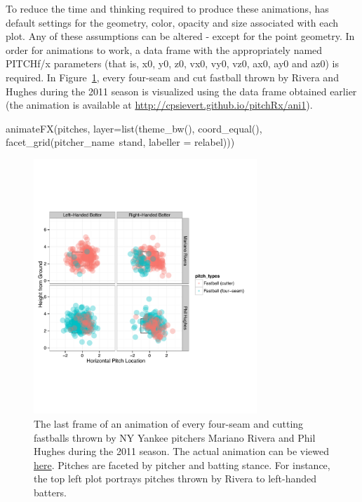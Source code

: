 \begin{article}
To reduce the time and thinking required to produce these animations,
 has default settings for the geometry, color, opacity
and size associated with each plot. Any of these assumptions can be
altered - except for the point geometry. In order for animations to
work, a data frame with the appropriately named PITCHf/x parameters
(that is, x0, y0, z0, vx0, vy0, vz0, ax0, ay0 and az0) is required.
In Figure~\ref{fig:animate1}, every four-seam and cut fastball thrown
by Rivera and Hughes during the 2011 season is visualized using the
 data frame obtained earlier (the animation is available
at \url{http://cpsievert.github.io/pitchRx/ani1}).
%
\begin{Schunk}
\begin{Sinput}
animateFX(pitches, layer=list(theme_bw(), coord_equal(),
  facet_grid(pitcher_name~stand, labeller = relabel)))
\end{Sinput}
\end{Schunk}
%
\begin{figure}[h]
\centerline{\includegraphics[width=0.75\textwidth]{ani-frame1.pdf}}

\caption{\label{fig:animate1}The last frame of an animation of every four-seam
and cutting fastballs thrown by NY Yankee pitchers Mariano Rivera
and Phil Hughes during the 2011 season. The actual animation can be
viewed \protect\href{http://cpsievert.github.io/pitchRx/ani1}{here}.
Pitches are faceted by pitcher and batting stance. For instance, the
top left plot portrays pitches thrown by Rivera to left-handed batters.}
\end{figure}



\end{article}
